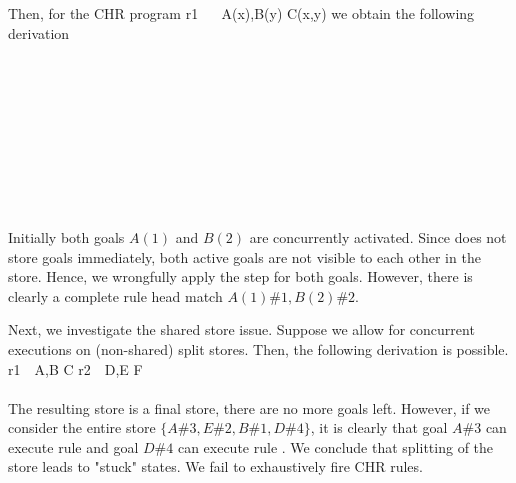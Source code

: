 \documentclass{tlp}
\begin{document}
Then, for the CHR program
 r1 ~\atsign~ A(x),B(y) \simparrow C(x,y) 
\eda
we obtain the following derivation
{\small
{}
   \myirule
   {
     \\ \\
     \sgap {} \partrans {} \\
    \mid\mid \\
     \sgap {} \partrans {}
    \ea}
   { \partrans {}} \\ \\
   \myirule
   {
     \sgap {} \partrans {} \\
    \mid\mid \\
     \sgap {} \partrans {} 
    \ea}
   { \partrans 
    }
  
\eda
}


Initially
both goals $A(1)$ and $B(2)$ are concurrently activated. Since  does not store goals
immediately, both active goals are not visible to each other in the store.
Hence, we wrongfully apply the  step for
both goals.
However, there is clearly  a complete rule head match $A(1)\#1,B(2)\#2$.

Next, we investigate the shared store issue.
Suppose we allow for concurrent executions on (non-shared) split stores.
Then, the following derivation is possible.
{\small
{}
   r1~\atsign~A,B \simparrow C \bgap r2~\atsign~D,E \simparrow F \\ \\
           { \partrans
            }
\eda
}
The resulting store is a final store, there are 
no more goals left. However, if we consider the entire store $\{A\#3,E\#2,B\#1,D\#4\}$, it is clearly
that goal $A\#3$ can execute rule  and goal $D\#4$ can execute rule .
We conclude that splitting of the store leads to "stuck" states. We fail
to exhaustively fire CHR rules.
\end{document}
